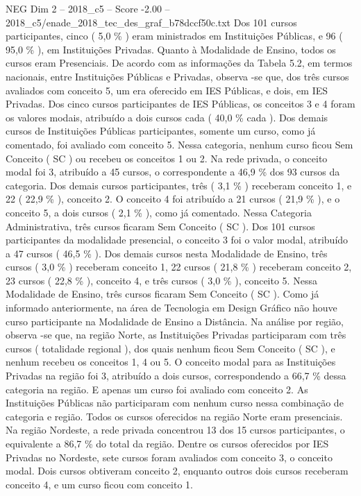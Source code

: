 \begin{textsample}{NEG Dim 2 – 2018\_c5 – Score -2.00 – 2018\_c5/enade\_2018\_tec\_des\_graf\_b78dccf50c.txt}
Dos 101 cursos participantes, cinco ( 5,0 \% ) eram ministrados em Instituições Públicas, e 96 ( 95,0 \% ), em Instituições Privadas.
Quanto à Modalidade de Ensino, todos os cursos eram Presenciais.
De acordo com as informações da Tabela 5.2, em termos nacionais, entre Instituições Públicas e Privadas, observa -se que, dos três cursos avaliados com conceito 5, um era oferecido em IES Públicas, e dois, em IES Privadas.
Dos cinco cursos participantes de IES Públicas, os conceitos 3 e 4 foram os valores modais, atribuído a dois cursos cada ( 40,0 \% cada ).
Dos demais cursos de Instituições Públicas participantes, somente um curso, como já comentado, foi avaliado com conceito 5.
Nessa categoria, nenhum curso ficou Sem Conceito ( SC ) ou recebeu os conceitos 1 ou 2.
Na rede privada, o conceito modal foi 3, atribuído a 45 cursos, o correspondente a 46,9 \% dos 93 cursos da categoria.
Dos demais cursos participantes, três ( 3,1 \% ) receberam conceito 1, e 22 ( 22,9 \% ), conceito 2.
O conceito 4 foi atribuído a 21 cursos ( 21,9 \% ), e o conceito 5, a dois cursos ( 2,1 \% ), como já comentado.
Nessa Categoria Administrativa, três cursos ficaram Sem Conceito ( SC ).
Dos 101 cursos participantes da modalidade presencial, o conceito 3 foi o valor modal, atribuído a 47 cursos ( 46,5 \% ).
Dos demais cursos nesta Modalidade de Ensino, três cursos ( 3,0 \% ) receberam conceito 1, 22 cursos ( 21,8 \% ) receberam conceito 2, 23 cursos ( 22,8 \% ), conceito 4, e três cursos ( 3,0 \% ), conceito 5.
Nessa Modalidade de Ensino, três cursos ficaram Sem Conceito ( SC ).
Como já informado anteriormente, na área de Tecnologia em Design Gráfico não houve curso participante na Modalidade de Ensino a Distância.
Na análise por região, observa -se que, na região Norte, as Instituições Privadas participaram com três cursos ( totalidade regional ), dos quais nenhum ficou Sem Conceito ( SC ), e nenhum recebeu os conceitos 1, 4 ou 5.
O conceito modal para as Instituições Privadas na região foi 3, atribuído a dois cursos, correspondendo a 66,7 \% dessa categoria na região.
E apenas um curso foi avaliado com conceito 2.
As Instituições Públicas não participaram com nenhum curso nessa combinação de categoria e região.
Todos os cursos oferecidos na região Norte eram presenciais.
Na região Nordeste, a rede privada concentrou 13 dos 15 cursos participantes, o equivalente a 86,7 \% do total da região.
Dentre os cursos oferecidos por IES Privadas no Nordeste, sete cursos foram avaliados com conceito 3, o conceito modal.
Dois cursos obtiveram conceito 2, enquanto outros dois cursos receberam conceito 4, e um curso ficou com conceito 1.

\end{textsample}
